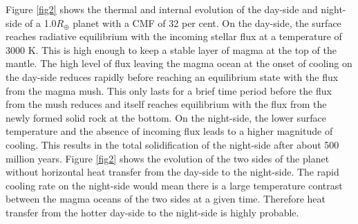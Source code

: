\documentclass[fleqn,usenatbib]{mnras}
\begin{document}
Figure \ref{fig2} shows the thermal and internal evolution of the day-side and night-side of a 1.0$R_{\oplus}$ planet with a CMF of 32 per cent. On the day-side, the surface reaches radiative equilibrium with the incoming stellar flux at a temperature of 3000 K. This is high enough to keep a stable layer of magma at the top of the mantle. The high level of flux leaving the magma ocean at the onset of cooling on the day-side reduces rapidly before reaching an equilibrium state with the flux from the magma mush. This only lasts for a brief time period before the flux from the mush reduces and itself reaches equilibrium with the flux from the newly formed solid rock at the bottom. On the night-side, the lower surface temperature and the absence of incoming flux leads to a higher magnitude of cooling. This results in the total solidification of the night-side after about 500 million years. Figure \ref{fig2} shows the evolution of the two sides of the planet without horizontal heat transfer from the day-side to the night-side. The rapid cooling rate on the night-side would mean there is a large temperature contrast between the magma oceans of the two sides at a given time. Therefore heat transfer from the hotter day-side to the night-side is highly probable. 
\end{document}

